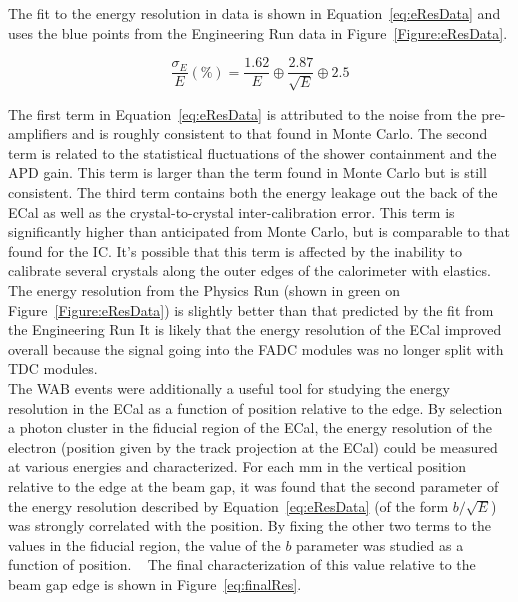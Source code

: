 The fit to the energy resolution in data is shown in Equation~\eqref{eq:eResData} and uses the blue points from the Engineering Run data in Figure~\ref{Figure:eResData}.

\begin{equation}
	\label{eq:eResData}
	\dfrac{\sigma_E}{E}(\%) = \dfrac{1.62}{E}\oplus\dfrac{2.87}{\sqrt{E}}\oplus2.5
\end{equation}

The first term in Equation~\eqref{eq:eResData} is attributed to the noise from the pre-amplifiers and is roughly consistent to that found in Monte Carlo. The second term is related to the statistical fluctuations of the shower containment and the APD gain. This term is larger than the term found in Monte Carlo but is still consistent. The third term contains both the energy leakage out the back of the ECal as well as the crystal-to-crystal inter-calibration error. This term is significantly higher than anticipated from Monte Carlo, but is comparable to that found for the IC. It's possible that this term is affected by the inability to calibrate several crystals along the outer edges of the calorimeter with elastics. \\
\indent The energy resolution from the Physics Run (shown in green on Figure~\ref{Figure:eResData}) is slightly better than that predicted by the fit from the Engineering Run It is likely that the energy resolution of the ECal improved overall because the signal going into the FADC modules was no longer split with TDC modules. \\
\indent The WAB events were additionally a useful tool for studying the energy resolution in the ECal as a function of position relative to the edge. By selection a photon cluster in the fiducial region of the ECal, the energy resolution of the electron (position given by the track projection at the ECal) could be measured at various energies and characterized. For each mm in the vertical position relative to the edge at the beam gap, it was found that the second parameter of the energy resolution described by Equation~\eqref{eq:eResData} (of the form $b/\sqrt{E}$) was strongly correlated with the position. By fixing the other two terms to the values in the fiducial region, the value of the $b$ parameter was studied as a function of position. ~\cite{CalibNote} The final characterization of this value relative to the beam gap edge is shown in Figure~\ref{eq:finalRes}.~\cite{Balossino}

